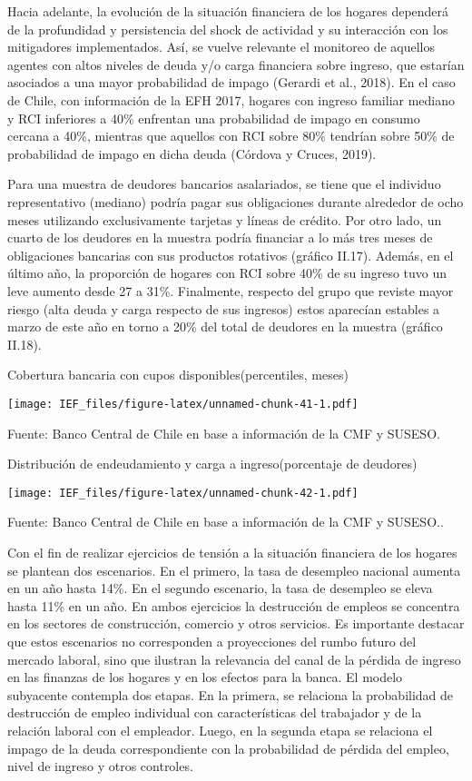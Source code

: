 \documentclass[
]{book}
\begin{document}
Hacia adelante, la evolución de la situación financiera de los hogares dependerá
de la profundidad y persistencia del shock de actividad y su interacción con los
mitigadores implementados. Así, se vuelve relevante el monitoreo de aquellos
agentes con altos niveles de deuda y/o carga financiera sobre ingreso, que
estarían asociados a una mayor probabilidad de impago (Gerardi et al., 2018).
En el caso de Chile, con información de la EFH 2017, hogares con ingreso
familiar mediano y RCI inferiores a 40\% enfrentan una probabilidad de impago
en consumo cercana a 40\%, mientras que aquellos con RCI sobre 80\%
tendrían sobre 50\% de probabilidad de impago en dicha deuda (Córdova y
Cruces, 2019).

Para una muestra de deudores bancarios asalariados, se tiene que el individuo
representativo (mediano) podría pagar sus obligaciones durante alrededor de
ocho meses utilizando exclusivamente tarjetas y líneas de crédito. Por otro lado,
un cuarto de los deudores en la muestra podría financiar a lo más tres meses de
obligaciones bancarias con sus productos rotativos (gráfico II.17). Además, en
el último año, la proporción de hogares con RCI sobre 40\% de su ingreso tuvo
un leve aumento desde 27 a 31\%. Finalmente, respecto del grupo que reviste
mayor riesgo (alta deuda y carga respecto de sus ingresos) estos aparecían
estables a marzo de este año en torno a 20\% del total de deudores en la
muestra (gráfico II.18).

Cobertura bancaria con cupos disponibles(percentiles, meses)

\texttt{[image: IEF\_files/figure-latex/unnamed-chunk-41-1.pdf]}

Fuente: Banco Central de Chile en base a información de la CMF y SUSESO.

Distribución de endeudamiento y carga a ingreso(porcentaje de deudores)

\texttt{[image: IEF\_files/figure-latex/unnamed-chunk-42-1.pdf]}

Fuente: Banco Central de Chile en base a información de la CMF y SUSESO..

Con el fin de realizar ejercicios de tensión a la situación financiera de los hogares
se plantean dos escenarios. En el primero, la tasa de desempleo nacional
aumenta en un año hasta 14\%. En el segundo escenario, la tasa de desempleo
se eleva hasta 11\% en un año. En ambos ejercicios la destrucción de empleos
se concentra en los sectores de construcción, comercio y otros servicios. Es
importante destacar que estos escenarios no corresponden a proyecciones del
rumbo futuro del mercado laboral, sino que ilustran la relevancia del canal de la
pérdida de ingreso en las finanzas de los hogares y en los efectos para la banca.
El modelo subyacente contempla dos etapas. En la primera, se relaciona la
probabilidad de destrucción de empleo individual con características del
trabajador y de la relación laboral con el empleador. Luego, en la segunda
etapa se relaciona el impago de la deuda correspondiente con la probabilidad
de pérdida del empleo, nivel de ingreso y otros controles.
\end{document}
